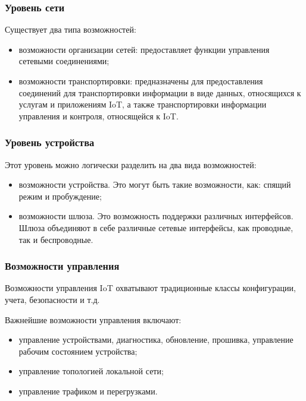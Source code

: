 
\subsubsection{Уровень сети}

Существует два типа возможностей:

\begin{itemize}
	\item возможности организации сетей: предоставляет функции управления 
сетевыми соединениями;
	\item возможности транспортировки: предназначены для предоставления 
соединений для транспортировки информации в виде данных, относящихся к услугам и 
приложениям IoT, а также транспортировки информации управления и контроля, 
относящейся к IoT.
\end{itemize}


\subsubsection{Уровень устройства}

Этот уровень можно логически разделить на два вида возможностей:
\begin{itemize}
	\item возможности устройства. Это могут быть такие возможности, как: 
спящий режим и пробуждение;
	\item возможности шлюза. Это возможность поддержки различных 
интерфейсов. Шлюза объединяют в себе различные сетевые интерфейсы, как 
проводные, так и беспроводные.
\end{itemize}


\subsubsection{Возможности управления}

Возможности управления IoT охватывают традиционные классы конфигурации, учета, 
безопасности и т.д.

Важнейшие возможности управления включают:
\begin{itemize}
	\item управление устройствами, диагностика, обновление, прошивка, 
управление рабочим состоянием устройства;
	\item управление топологией локальной сети;
	\item управление трафиком и перегрузками.
\end{itemize}

